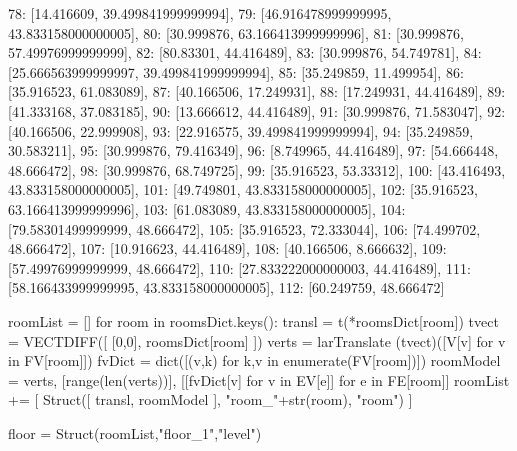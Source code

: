 { 78: [14.416609, 39.499841999999994],
 79: [46.916478999999995, 43.833158000000005],
 80: [30.999876, 63.166413999999996],
 81: [30.999876, 57.49976999999999],
 82: [80.83301, 44.416489],
 83: [30.999876, 54.749781],
 84: [25.666563999999997, 39.499841999999994],
 85: [35.249859, 11.499954],
 86: [35.916523, 61.083089],
 87: [40.166506, 17.249931],
 88: [17.249931, 44.416489],
 89: [41.333168, 37.083185],
 90: [13.666612, 44.416489],
 91: [30.999876, 71.583047],
 92: [40.166506, 22.999908],
 93: [22.916575, 39.499841999999994],
 94: [35.249859, 30.583211],
 95: [30.999876, 79.416349],
 96: [8.749965, 44.416489],
 97: [54.666448, 48.666472],
 98: [30.999876, 68.749725],
 99: [35.916523, 53.33312],
 100: [43.416493, 43.833158000000005],
 101: [49.749801, 43.833158000000005],
 102: [35.916523, 63.166413999999996],
 103: [61.083089, 43.833158000000005],
 104: [79.58301499999999, 48.666472],
 105: [35.916523, 72.333044],
 106: [74.499702, 48.666472],
 107: [10.916623, 44.416489],
 108: [40.166506, 8.666632],
 109: [57.49976999999999, 48.666472],
 110: [27.833222000000003, 44.416489],
 111: [58.166433999999995, 43.833158000000005],
 112: [60.249759, 48.666472]}
 
 
roomList = []
for room in roomsDict.keys():
 	transl = t(*roomsDict[room])
	tvect = VECTDIFF([ [0,0], roomsDict[room] ])
	verts = larTranslate (tvect)([V[v] for v in FV[room]])
	fvDict = dict([(v,k) for k,v in enumerate(FV[room])])
	roomModel = verts, [range(len(verts))], [[fvDict[v] for v in EV[e]] for e in FE[room]]
 	roomList += [ Struct([ transl, roomModel ], "room_"+str(room), "room") ]
	
floor = Struct(roomList,"floor_1","level")






